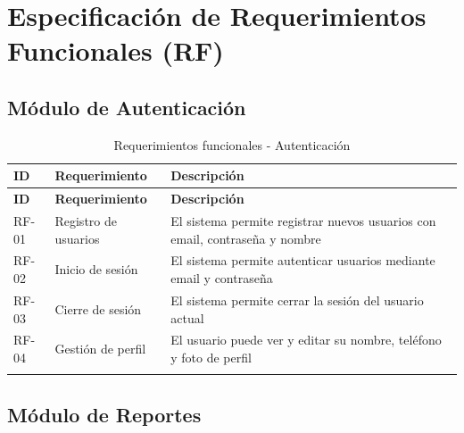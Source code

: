 \documentclass[12pt,a4paper]{article}
\begin{document}

\section{Especificación de Requerimientos Funcionales (RF)}

\subsection{Módulo de Autenticación}

\begin{longtable}{|p{1.5cm}|p{4cm}|p{8cm}|}
\hline
\textbf{ID} & \textbf{Requerimiento} & \textbf{Descripción} \\
\hline
\endfirsthead
\hline
\textbf{ID} & \textbf{Requerimiento} & \textbf{Descripción} \\
\hline
\endhead
RF-01 & Registro de usuarios & El sistema permite registrar nuevos usuarios con email, contraseña y nombre \\
\hline
RF-02 & Inicio de sesión & El sistema permite autenticar usuarios mediante email y contraseña \\
\hline
RF-03 & Cierre de sesión & El sistema permite cerrar la sesión del usuario actual \\
\hline
RF-04 & Gestión de perfil & El usuario puede ver y editar su nombre, teléfono y foto de perfil \\
\hline
\caption{Requerimientos funcionales - Autenticación}
\end{longtable}

\subsection{Módulo de Reportes}
\end{document}
